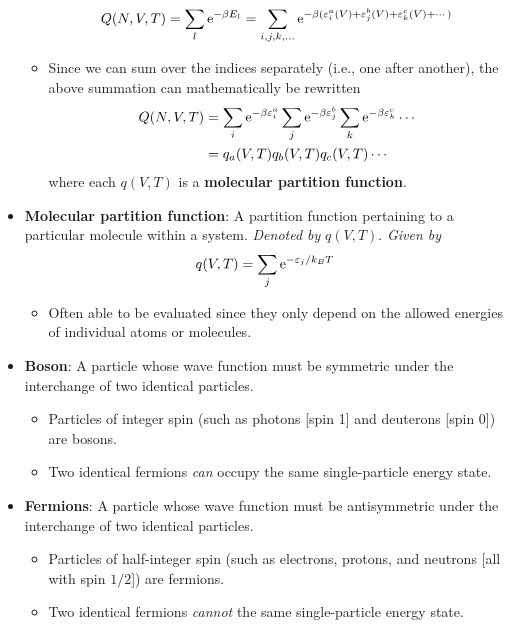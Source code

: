 \documentclass[../notes.tex]{subfiles}
\begin{document}
\begin{itemize}
\begin{itemize}
\begin{equation*}
            Q(N,V,T) = \sum_l\e[-\beta E_l] = \sum_{i,j,k,\dots}\e[-\beta(\varepsilon_i^a(V)+\varepsilon_j^b(V)+\varepsilon_k^c(V)+\cdots)]
        \end{equation*}
        \item Since we can sum over the indices separately (i.e., one after another), the above summation can mathematically be rewritten
        \begin{align*}
            Q(N,V,T) &= \sum_i\e[-\beta\varepsilon_i^a]\sum_j\e[-\beta\varepsilon_j^b]\sum_k\e[-\beta\varepsilon_k^c]\cdots\\
            &= q_a(V,T)q_b(V,T)q_c(V,T)\cdots
        \end{align*}
        where each $q(V,T)$ is a \textbf{molecular partition function}.
    \end{itemize}
    \item \textbf{Molecular partition function}: A partition function pertaining to a particular molecule within a system. \emph{Denoted by} $q(V,T)$. \emph{Given by}
    \begin{equation*}
        q(V,T) = \sum_j\e[-\varepsilon_j/k_BT]
    \end{equation*}
    \begin{itemize}
        \item Often able to be evaluated since they only depend on the allowed energies of individual atoms or molecules.
    \end{itemize}
    \item \textbf{Boson}: A particle whose wave function must be symmetric under the interchange of two identical particles.
    \begin{itemize}
        \item Particles of integer spin (such as photons [spin 1] and deuterons [spin 0]) are bosons.
        \item Two identical fermions \emph{can} occupy the same single-particle energy state.
    \end{itemize}
    \item \textbf{Fermions}: A particle whose wave function must be antisymmetric under the interchange of two identical particles.
    \begin{itemize}
        \item Particles of half-integer spin (such as electrons, protons, and neutrons [all with spin $1/2$]) are fermions.
        \item Two identical fermions \emph{cannot} the same single-particle energy state.
    \end{itemize}

\end{itemize}
\end{document}
